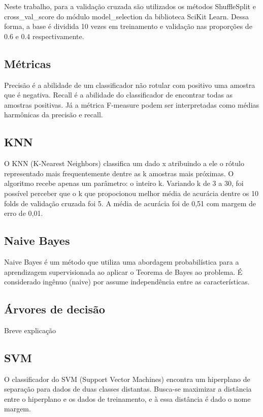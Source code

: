 \documentclass[conference]{IEEEtran}
\begin{document}
Neste trabalho, para a validação cruzada são utilizados os métodos ShuffleSplit
e cross\_val\_score do módulo model\_selection da biblioteca SciKit Learn. Dessa
forma, a base é dividida 10 vezes em treinamento e validação nas proporções de
0.6 e 0.4 respectivamente.

\subsection{Métricas}

Precisão é a abilidade de um classificador não rotular com positivo uma amostra
que é negativa. Recall é a abilidade do classificador de encontrar todas as
amostras positivas. Já a métrica F-measure podem ser interpretadas como médias
harmônicas da precisão e recall.


\subsection{KNN}

O KNN (K-Nearest Neighbors) classifica um dado x atribuindo a ele o rótulo
representado mais frequentemente dentre as k amostras mais próximas. O
algoritmo recebe apenas um parâmetro: o inteiro k. Variando k de 3 a 30, foi
possível perceber que o k que propocionou melhor média de acurácia dentre os 10
folds de validação cruzada foi 5. A média de acurácia foi de 0,51 com margem de
erro de 0,01.


\subsection{Naive Bayes}

Naive Bayes é um método que utiliza uma abordagem probabilística para a
aprendizagem supervisionada ao aplicar o Teorema de Bayes ao problema. É
considerado ingênuo (naive) por assume independência entre as características.


\subsection{Árvores de decisão}

Breve explicação


\subsection{SVM}

O classificador do SVM (Support Vector Machines) encontra um hiperplano de
separação para dados de duas classes distantas. Busca-se maximizar a distância
entre o hiperplano e os dados de treinamento, e à essa distância é dado o nome
margem.
\end{document}
